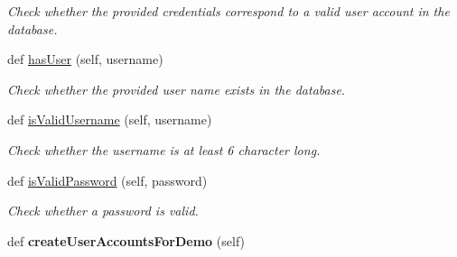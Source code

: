 \begin{DoxyCompactItemize}
\begin{DoxyCompactList}\small\item\em Check whether the provided credentials correspond to a valid user account in the database. \end{DoxyCompactList}\item 
def \hyperlink{classsrc_1_1database_1_1_database_a12d75fd9334f108d345cdbd3ee8816a9}{has\+User} (self, username)
\begin{DoxyCompactList}\small\item\em Check whether the provided user name exists in the database. \end{DoxyCompactList}\item 
def \hyperlink{classsrc_1_1database_1_1_database_ad5f2e607e41b9b4d1e956d1a9a229afa}{is\+Valid\+Username} (self, username)
\begin{DoxyCompactList}\small\item\em Check whether the username is at least 6 character long. \end{DoxyCompactList}\item 
def \hyperlink{classsrc_1_1database_1_1_database_ae1b03c0a444fc7600f6d6333b0270437}{is\+Valid\+Password} (self, password)
\begin{DoxyCompactList}\small\item\em Check whether a password is valid. \end{DoxyCompactList}\item 
\hypertarget{classsrc_1_1database_1_1_database_a5bcb118c8b6079d851a6adb429eae756}{}def {\bfseries create\+User\+Accounts\+For\+Demo} (self)\label{classsrc_1_1database_1_1_database_a5bcb118c8b6079d851a6adb429eae756}


\end{DoxyCompactItemize}
